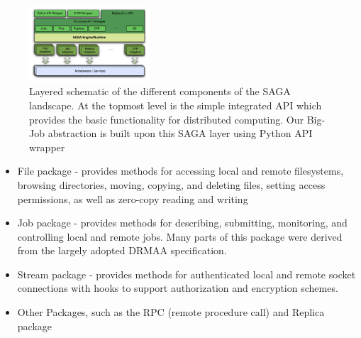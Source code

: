 \documentclass[conference,final]{IEEEtran}
\begin{document}
\begin{figure}[!ht]
 \begin{center}
     \includegraphics[width=0.40\textwidth]{stci_saga_figures-1.pdf}
 \end{center}
\caption{\small Layered schematic of the different components of the
   SAGA landscape. At the topmost level is the simple integrated API
   which provides the basic functionality for distributed
   computing. Our Big-Job abstraction is built upon this SAGA layer
   using Python API wrapper} \label{Fig:SAGA1}
\end{figure}

\begin{itemize}
\item File package - provides methods for accessing local and remote
 filesystems, browsing directories, moving, copying, and deleting
 files, setting access permissions, as well as zero-copy reading and
 writing
\item Job package - provides methods for describing, submitting,
 monitoring, and controlling local and remote jobs. Many parts of
 this package were derived from the largely adopted
 DRMAA %
 specification.
\item Stream package - provides methods for authenticated local and
 remote socket connections with hooks to support authorization and
 encryption schemes.
\item Other Packages, such as the RPC (remote procedure call) and Replica
 package
\end{itemize}
\end{document}
